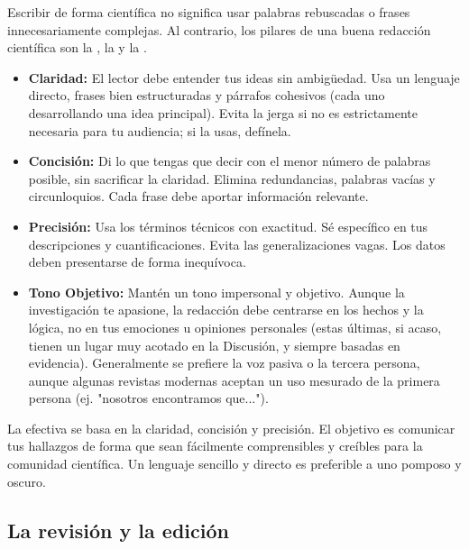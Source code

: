 Escribir de forma científica no significa usar palabras rebuscadas o frases
innecesariamente complejas.
Al contrario, los pilares de una buena redacción científica son la
, la  y la .

\begin{itemize}
  \item \textbf{Claridad:} El lector debe entender tus ideas sin ambigüedad.
        Usa un lenguaje directo, frases bien estructuradas y párrafos cohesivos
        (cada uno desarrollando una idea principal).
        Evita la jerga si no es estrictamente necesaria para tu audiencia; si la
        usas, defínela.
  \item \textbf{Concisión:} Di lo que tengas que decir con el menor número de
        palabras posible, sin sacrificar la claridad.
        Elimina redundancias, palabras vacías y circunloquios.
        Cada frase debe aportar información relevante.
  \item \textbf{Precisión:} Usa los términos técnicos con exactitud.
        Sé específico en tus descripciones y cuantificaciones.
        Evita las generalizaciones vagas.
        Los datos deben presentarse de forma inequívoca.
  \item \textbf{Tono Objetivo:} Mantén un tono impersonal y objetivo.
        Aunque la investigación te apasione, la redacción debe centrarse en los
        hechos y la lógica, no en tus emociones u opiniones personales (estas
        últimas, si acaso, tienen un lugar muy acotado en la Discusión, y siempre
        basadas en evidencia).
        Generalmente se prefiere la voz pasiva o la tercera persona, aunque algunas
        revistas modernas aceptan un uso mesurado de la primera persona (ej. "nosotros
        encontramos que...").
\end{itemize}

\begin{remember}
  \label{rem:claridadcientifica}
  La  efectiva se basa en la claridad,
  concisión y precisión.
  El objetivo es comunicar tus hallazgos de forma que sean fácilmente
  comprensibles y creíbles para la comunidad científica.
  Un lenguaje sencillo y directo es preferible a uno pomposo y oscuro.
\end{remember}

\subsection*{La revisión y la edición}
\label{sub:revisionyedicions}

